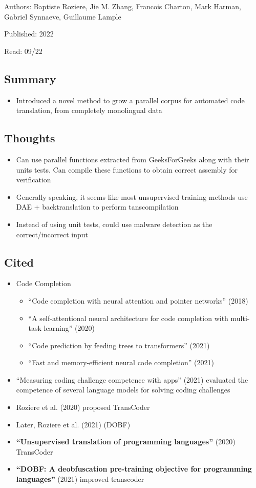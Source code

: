\documentclass{article}
\begin{document}
\noindent Authors: Baptiste Roziere, Jie M. Zhang, Francois Charton, Mark Harman, Gabriel Synnaeve, Guillaume Lample

\noindent Published: 2022

\noindent Read: 09/22

\subsection*{Summary}
\begin{itemize}
	\item Introduced a novel method to grow a parallel corpus for automated code translation, from completely monolingual data
\end{itemize}

\subsection*{Thoughts}
\begin{itemize}
	\item Can use parallel functions extracted from GeeksForGeeks along with their units tests. Can compile these functions to obtain correct assembly for verification
	\item Generally speaking, it seems like most unsupervised training methods use DAE + backtranslation to perform tanscompilation 
	\item Instead of using unit tests, could use malware detection as the correct/incorrect input
\end{itemize}

\subsection*{Cited}
\begin{itemize}
	\item Code Completion
	\begin{itemize}
		\item ``Code completion with neural attention and pointer networks'' (2018)
		\item ``A self-attentional neural architecture for code completion with multi-task learning'' (2020)
		\item ``Code prediction by feeding trees to transformers'' (2021)
		\item ``Fast and memory-efficient neural code completion'' (2021)
	\end{itemize}
	\item ``Measuring coding challenge competence with apps'' (2021) evaluated the competence of several language models for solving coding challenges
	\item Roziere et al. (2020) proposed TransCoder
	\item Later, Roziere et al. (2021)  (DOBF)
	\item \textbf{``Unsupervised translation of programming languages''} (2020) TransCoder
	\item \textbf{``DOBF: A deobfuscation pre-training objective for programming languages''} (2021) improved transcoder
\end{itemize}
\end{document}

